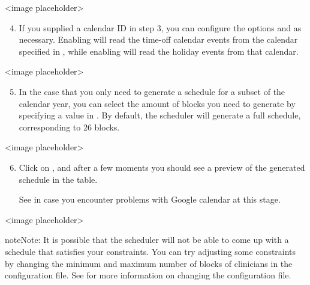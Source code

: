 \documentclass[letterpaper,10pt,english]{sphinxmanual}
\begin{document}
\textless{}image placeholder\textgreater{}
\begin{enumerate}
\setcounter{enumi}{3}
\item {} 
 If you supplied a calendar ID in step 3, you can configure
the options  and  as necessary.
Enabling  will read the time-off calendar events
from the calendar specified in , while enabling
 will read the holiday events from that calendar.

\end{enumerate}

\textless{}image placeholder\textgreater{}
\begin{enumerate}
\setcounter{enumi}{4}
\item {} 
 In the case that you only need to generate a schedule for
a subset of the calendar year, you can select the amount of blocks you need
to generate by specifying a value in . By default, the
scheduler will generate a full schedule, corresponding to 26 blocks.

\end{enumerate}

\textless{}image placeholder\textgreater{}
\begin{enumerate}
\setcounter{enumi}{5}
\item {} 
Click on , and after a few moments you should see a preview of
the generated schedule in the table.

 See {\hyperref[\detokenize{index:authentication}]{}} in case you encounter problems
with Google calendar at this stage.

\end{enumerate}

\textless{}image placeholder\textgreater{}

\begin{sphinxadmonition}{note}{Note:}
It is possible that the scheduler will not be able to come up with a
schedule that satisfies your constraints. You can try adjusting
some constraints by changing the minimum and maximum number of blocks of
clinicians in the configuration file. See {\hyperref[\detokenize{index:clinician-configuration}]{}}
for more information on changing the configuration file.
\end{sphinxadmonition}
\end{document}
